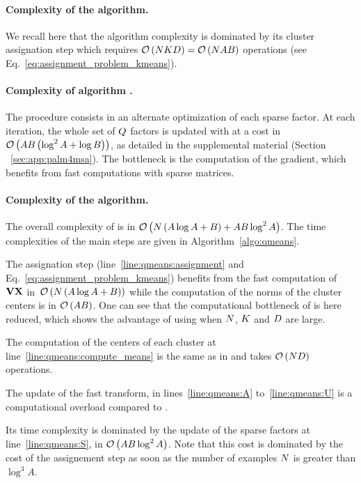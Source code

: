 \paragraph{Complexity of the \kmeans algorithm.}
We recall here that the \kmeans algorithm complexity is dominated by its cluster assignation step which requires $\mathcal{O}\left(NKD\right)=\mathcal{O}\left(N A B\right)$ operations (see Eq.~\eqref{eq:assignment_problem_kmeans}).

\paragraph{Complexity of algorithm \palm.} The procedure consists in an alternate optimization of each sparse factor. 
At each iteration, the whole set of $Q$ factors is updated with at a cost in $\mathcal{O}\left(AB\left (\log^2 A+\log B\right )\right)$, as detailed in the supplemental material (Section ~\ref{sec:app:palm4msa}). 
The bottleneck is the computation of the gradient, which benefits from fast computations with sparse matrices.


\paragraph{Complexity of the \qkmeans algorithm.} The overall complexity of \qkmeans is in $\mathcal{O}\left(N\left(A\log A+B\right ) + AB \log^2 A\right)$. The time complexities of the main steps are given in Algorithm~\ref{algo:qmeans}. 

The assignation step (line~\ref{line:qmeans:assignment} and Eq.~\eqref{eq:assignment_problem_kmeans}) benefits from the fast computation of ${\mathbf{V}} {\mathbf{X}}$ in~$\mathcal{O}\left(N\left(A\log A+B\right )\right)$ while the computation of the norms of the cluster centers is in $\mathcal{O}\left(AB\right)$.
One can see that the computational bottleneck of \kmeans is here reduced, which shows the advantage of using \qkmeans when $N$, $K$ and $D$ are large.

The computation of the centers of each cluster at line~\ref{line:qmeans:compute_means} is the same as in \kmeans and takes $\mathcal{O}\left(ND\right)$ operations.

The update of the fast transform, in lines~\ref{line:qmeans:A} to~\ref{line:qmeans:U} is a computational overload compared to \kmeans. 

Its time complexity is dominated by the update of the sparse factors at line~\ref{line:qmeans:S}, in $\mathcal{O}\left(AB \log^2 A\right)$. 
Note that this cost is dominated by the cost of the assignement step as soon as the number of examples $N$ is greater than $\log^3 A$. 

